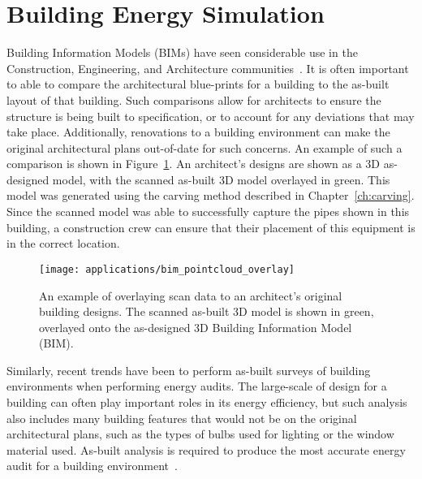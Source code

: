 \documentclass[12pt,onecolumn,oneside]{book}
\begin{document}
\section{Building Energy Simulation}
\label{sec:application_energyplus}

Building Information Models (BIMs) have seen considerable use in the Construction, Engineering, and Architecture communities~\cite{AutodeskBIM}.  It is often important to able to compare the architectural blue-prints for a building to the as-built layout of that building.  Such comparisons allow for architects to ensure the structure is being built to specification, or to account for any deviations that may take place.  Additionally, renovations to a building environment can make the original architectural plans out-of-date for such concerns.  An example of such a comparison is shown in Figure~\ref{fig:bim_pointcloud_overlay}.  An architect's designs are shown as a 3D as-designed model, with the scanned as-built 3D model overlayed in green.  This model was generated using the carving method described in Chapter~\ref{ch:carving}.  Since the scanned model was able to successfully capture the pipes shown in this building, a construction crew can ensure that their placement of this equipment is in the correct location.

\begin{figure}[t]

	\centerline{\texttt{[image: applications/bim\_pointcloud\_overlay]}}
	
	\caption[Overlay of a scanned as-build 3D model with an architectural BIM.]{An example of overlaying scan data to an architect's original building designs.  The scanned as-built 3D model is shown in green, overlayed onto the as-designed 3D Building Information Model (BIM).}
	\label{fig:bim_pointcloud_overlay}
\end{figure}

Similarly, recent trends have been to perform as-built surveys of building environments when performing energy audits.  The large-scale of design for a building can often play important roles in its energy efficiency, but such analysis also includes many building features that would not be on the original architectural plans, such as the types of bulbs used for lighting or the window material used.  As-built analysis is required to produce the most accurate energy audit for a building environment~\cite{EBConsulting}.
\end{document}
